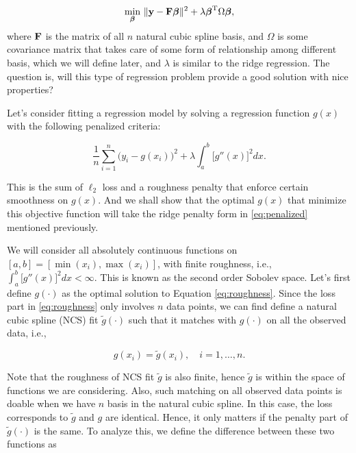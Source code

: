 \documentclass[
]{book}
\def\bF{{\bf F}}
\theoremstyle{definition}
\theoremstyle{definition}
\theoremstyle{definition}
\theoremstyle{definition}
\theoremstyle{remark}
\begin{document}
\begin{equation}
\underset{\boldsymbol \beta}{\text{min}} \,\, \lVert \mathbf{y}- \bF \boldsymbol \beta\rVert^2 + \lambda \boldsymbol \beta^\text{T}\Omega \boldsymbol \beta, \label{eq:penalized}
\end{equation}
where \(\bF\) is the matrix of all \(n\) natural cubic spline basis, and \(\Omega\) is some covariance matrix that takes care of some form of relationship among different basis, which we will define later, and \(\lambda\) is similar to the ridge regression. The question is, will this type of regression problem provide a good solution with nice properties?

Let's consider fitting a regression model by solving a regression function \(g(x)\) with the following penalized criteria:

\begin{equation}
\frac{1}{n} \sum_{i=1}^n \big(y_i - g(x_i)\big)^2 + \lambda \int_a^b \big[g''(x) \big]^2 dx. \label{eq:roughness}
\end{equation}

This is the sum of \(\ell_2\) loss and a roughness penalty that enforce certain smoothness on \(g(x)\). And we shall show that the optimal \(g(x)\) that minimize this objective function will take the ridge penalty form in \eqref{eq:penalized} mentioned previously.

We will consider all absolutely continuous functions on \([a, b] = [\min(x_i), \max(x_i)]\), with finite roughness, i.e., \(\int_a^b \big[g''(x) \big]^2 dx < \infty\). This is known as the second order Sobolev space. Let's first define \(g(\cdot)\) as the optimal solution to Equation \eqref{eq:roughness}. Since the loss part in \eqref{eq:roughness} only involves \(n\) data points, we can find define a natural cubic spline (NCS) fit \(\tilde{g}(\cdot)\) such that it matches with \(g(\cdot)\) on all the observed data, i.e.,

\[g(x_i) = \widetilde{g}(x_i), \quad i = 1, \ldots, n.\]

Note that the roughness of NCS fit \(\widetilde{g}\) is also finite, hence \(\widetilde{g}\) is within the space of functions we are considering. Also, such matching on all observed data points is doable when we have \(n\) basis in the natural cubic spline. In this case, the loss corresponds to \(\tilde{g}\) and \(g\) are identical. Hence, it only matters if the penalty part of \(\tilde{g}(\cdot)\) is the same. To analyze this, we define the difference between these two functions as
\end{document}
